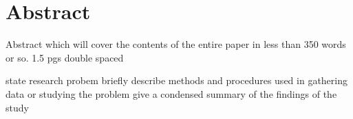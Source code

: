 \section{Abstract}

Abstract which will cover the contents of the entire paper in less than 350 words or so.
1.5 pgs double spaced

state research probem briefly
describe methods and procedures used in gathering data or studying the problem
give a condensed summary of the findings of the study

